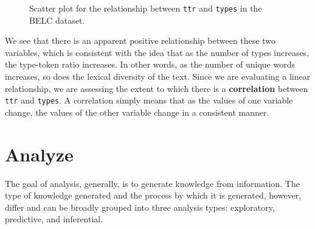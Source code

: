 \documentclass[
  letterpaper,
]{latex/krantz}
\theoremstyle{definition}
\theoremstyle{remark}
\begin{document}
\begin{figure}[H]
\begin{minipage}{0.50\linewidth}
{}


\end{minipage}%

\caption{\label{fig-aa-belc-scatter-plot}Scatter plot for the
relationship between \texttt{ttr} and \texttt{types} in the BELC
dataset.}

\end{figure}%

We see that there is an apparent positive relationship between these two
variables, which is consistent with the idea that as the number of types
increases, the type-token ratio increases. In other words, as the number
of unique words increases, so does the lexical diversity of the text.
Since we are evaluating a linear relationship, we are assessing the
extent to which there is a \textbf{correlation} between \texttt{ttr} and
\texttt{types}. A correlation simply means that as the values of one
variable change, the values of the other variable change in a consistent
manner.

\section{Analyze}\label{sec-aa-analyze}

The goal of analysis, generally, is to generate knowledge from
information. The type of knowledge generated and the process by which it
is generated, however, differ and can be broadly grouped into three
analysis types: exploratory, predictive, and inferential.
\end{document}
